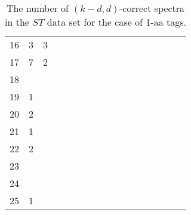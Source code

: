 \documentclass{article}
\begin{document}
\begin{table}[h]
{\begin{tabular}{|c|c|
c|c|c|c|c|c|c|c|c|c|c|c|c|c|c|}
16  & 3 & 3 &  &  &  &  &  &  &  &  &  &  &  &  &  & \\

17  & 7 & 2 &  &  &  &  &  &  &  &  &  &  &  &  &  & \\

18  &  &  &  &  &  &  &  &  &  &  &  &  &  &  &  & \\

19  & 1 &  &  &  &  &  &  &  &  &  &  &  &  &  &  & \\

20  & 2 &  &  &  &  &  &  &  &  &  &  &  &  &  &  & \\

21  & 1 &  &  &  &  &  &  &  &  &  &  &  &  &  &  & \\

22  & 2 &  &  &  &  &  &  &  &  &  &  &  &  &  &  & \\

23  &  &  &  &  &  &  &  &  &  &  &  &  &  &  &  & \\

24  &  &  &  &  &  &  &  &  &  &  &  &  &  &  &  & \\

25  & 1 &  &  &  &  &  &  &  &  &  &  &  &  &  &  & \\

  \hline
\end{tabular}
\par}
\centering
\caption{The number of $(k-d,d)$-correct spectra in the $ST$ data set for the case of 1-aa tags.}
\vspace{3mm}
\label{table:kd-1-ST}
\end{table}
\end{document}
